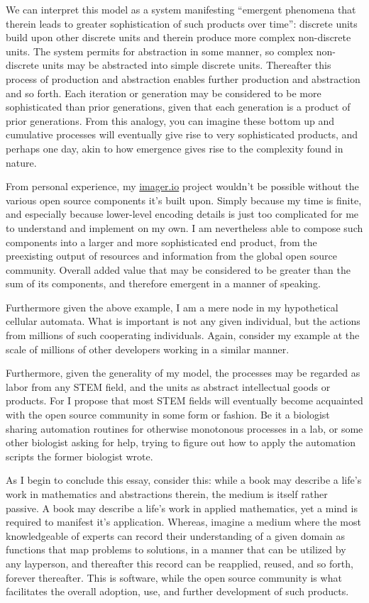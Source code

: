 We can interpret this model as a system manifesting “emergent phenomena that therein leads to greater sophistication of such products over time”: discrete units build upon other discrete units and therein produce more complex non-discrete units. The system permits for abstraction in some manner, so complex non-discrete units may be abstracted into simple discrete units. Thereafter this process of production and abstraction enables further production and abstraction and so forth. Each iteration or generation may be considered to be more sophisticated than prior generations, given that each generation is a product of prior generations. From this analogy, you can imagine these bottom up and cumulative processes will eventually give rise to very sophisticated products, and perhaps one day, akin to how emergence gives rise to the complexity found in nature.

From personal experience, my \url{imager.io} project wouldn’t be possible without the various open source components it’s built upon. Simply because my time is finite, and especially because lower-level encoding details is just too complicated for me to understand and implement on my own. I am nevertheless able to compose such components into a larger and more sophisticated end product, from the preexisting output of resources and information from the global open source community. Overall added value that may be considered to be greater than the sum of its components, and therefore emergent in a manner of speaking.

Furthermore given the above example, I am a mere node in my hypothetical cellular automata. What is important is not any given individual, but the actions from millions of such cooperating individuals. Again, consider my example at the scale of millions of other developers working in a similar manner.

Furthermore, given the generality of my model, the processes may be regarded as labor from any STEM field, and the units as abstract intellectual goods or products. For I propose that most STEM fields will eventually become acquainted with the open source community in some form or fashion. Be it a biologist sharing automation routines for otherwise monotonous processes in a lab, or some other biologist asking for help, trying to figure out how to apply the automation scripts the former biologist wrote.

As I begin to conclude this essay, consider this: while a book may describe a life’s work in mathematics and abstractions therein, the medium is itself rather passive. A book may describe a life’s work in applied mathematics, yet a mind is required to manifest it’s application. Whereas, imagine a medium where the most knowledgeable of experts can record their understanding of a given domain as functions that map problems to solutions, in a manner that can be utilized by any layperson, and thereafter this record can be reapplied, reused, and so forth, forever thereafter. This is software, while the open source community is what facilitates the overall adoption, use, and further development of such products.

